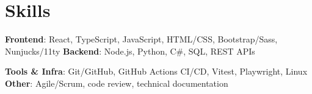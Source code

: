 \documentclass[letterpaper,10pt]{article}
\begin{document}
  \resumeSubHeadingListEnd


\section{Skills}
 \resumeSubHeadingListStart
   \item{
     \textbf{Frontend}{: React, TypeScript, JavaScript, HTML/CSS, Bootstrap/Sass, Nunjucks/11ty}
     \hfill
     \textbf{Backend}{: Node.js, Python, C\#, SQL, REST APIs}
   }
   \item{
     \textbf{Tools \& Infra}{: Git/GitHub, GitHub Actions CI/CD, Vitest, Playwright, Linux}
     \hfill
     \textbf{Other}{: Agile/Scrum, code review, technical documentation}
   }
 \resumeSubHeadingListEnd

\end{document}
